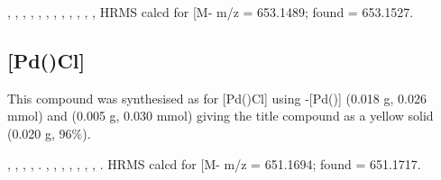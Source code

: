 ,
,
,
,
,
,
,
,
,
,
,
,
HRMS calcd for  [M-\ce{PF6]+} m/z = 653.1489; found = 653.1527.


\subsection*{[Pd(\tBusixantphosk)Cl]}


This compound was synthesised as for [Pd(\tButhixantphosk)Cl] using \trans{}-[Pd(\tBusixantphos)] (0.018 g, 0.026 mmol) and  (0.005 g, 0.030 mmol) giving the title compound as a yellow solid (0.020 g, 96\%).

\begin{sloppypar}
,
,
,
,
.
,
,
,
,
,
,
,
.
HRMS calcd for  [M-\ce{PF6]+} m/z = 651.1694; found = 651.1717.
\end{sloppypar}

